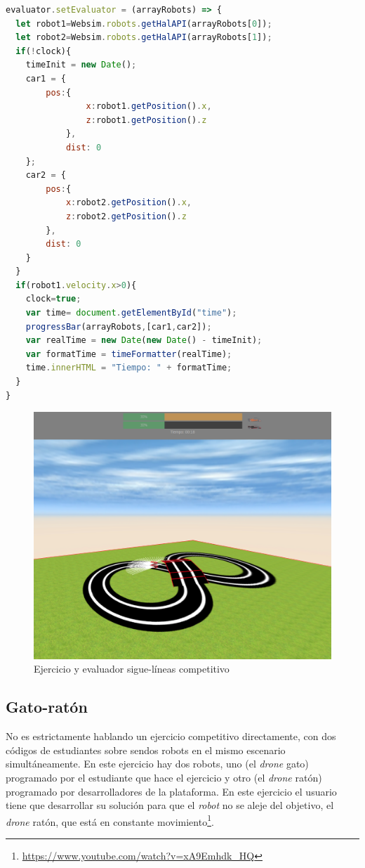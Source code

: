  \begin{lstlisting}[language=javascript,caption=Función que realiza la funcionalidad para rellenar la barra de progreso]
evaluator.setEvaluator = (arrayRobots) => {
  let robot1=Websim.robots.getHalAPI(arrayRobots[0]);
  let robot2=Websim.robots.getHalAPI(arrayRobots[1]);
  if(!clock){
    timeInit = new Date();
    car1 = {
        pos:{
                x:robot1.getPosition().x,
                z:robot1.getPosition().z
            },
            dist: 0
    };
    car2 = {
        pos:{
            x:robot2.getPosition().x,
            z:robot2.getPosition().z
        },
        dist: 0
    }
  }
  if(robot1.velocity.x>0){
    clock=true;
    var time= document.getElementById("time");
    progressBar(arrayRobots,[car1,car2]);
    var realTime = new Date(new Date() - timeInit);
    var formatTime = timeFormatter(realTime);
    time.innerHTML = "Tiempo: " + formatTime;
  }
}
\end{lstlisting}
            
\begin{figure}[H]
    \centering           
    \includegraphics[scale=0.2]{img/evaluator_follow_line.png}
    \caption{Ejercicio y evaluador sigue-líneas competitivo}
    \label{fig:evaluador_siguelineas}
\end{figure}

\subsection{Gato-ratón}
\label{subsec:gatoraton}
No es estrictamente hablando un ejercicio competitivo directamente, con dos códigos de estudiantes sobre sendos robots en el mismo escenario simultáneamente. En este ejercicio hay dos robots, uno (el \textit{drone} gato) programado por el estudiante que hace el ejercicio y otro (el \textit{drone} ratón) programado por desarrolladores de la plataforma. 
En este ejercicio el usuario tiene que desarrollar su solución para que el \textit{robot} no se aleje del objetivo, el \textit{drone} ratón, que está en constante movimiento\footnote{\url{https://www.youtube.com/watch?v=xA9Emhdk_HQ}}. 

